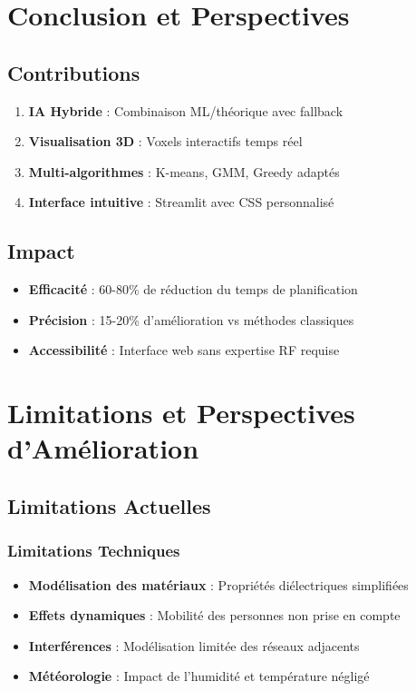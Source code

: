 \documentclass[12pt,a4paper]{article}
\begin{document}
\section{Conclusion et Perspectives}

\subsection{Contributions}

\begin{enumerate}
    \item \textbf{IA Hybride} : Combinaison ML/théorique avec fallback
    \item \textbf{Visualisation 3D} : Voxels interactifs temps réel  
    \item \textbf{Multi-algorithmes} : K-means, GMM, Greedy adaptés
    \item \textbf{Interface intuitive} : Streamlit avec CSS personnalisé
\end{enumerate}

\subsection{Impact}

\begin{itemize}
    \item \textbf{Efficacité} : 60-80\% de réduction du temps de planification
    \item \textbf{Précision} : 15-20\% d'amélioration vs méthodes classiques
    \item \textbf{Accessibilité} : Interface web sans expertise RF requise
\end{itemize}

\section{Limitations et Perspectives d'Amélioration}

\subsection{Limitations Actuelles}

\subsubsection{Limitations Techniques}

\begin{itemize}
    \item \textbf{Modélisation des matériaux} : Propriétés diélectriques simplifiées
    \item \textbf{Effets dynamiques} : Mobilité des personnes non prise en compte
    \item \textbf{Interférences} : Modélisation limitée des réseaux adjacents
    \item \textbf{Météorologie} : Impact de l'humidité et température négligé
\end{itemize}
\end{document}

